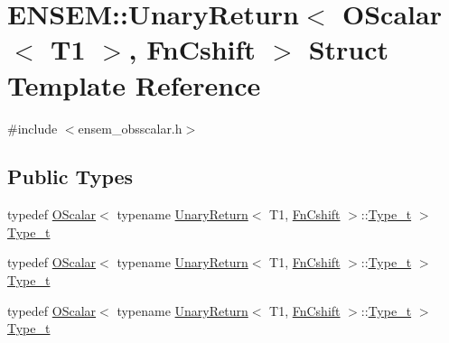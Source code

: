 \hypertarget{structENSEM_1_1UnaryReturn_3_01OScalar_3_01T1_01_4_00_01FnCshift_01_4}{}\section{E\+N\+S\+EM\+:\+:Unary\+Return$<$ O\+Scalar$<$ T1 $>$, Fn\+Cshift $>$ Struct Template Reference}
\label{structENSEM_1_1UnaryReturn_3_01OScalar_3_01T1_01_4_00_01FnCshift_01_4}


{\ttfamily \#include $<$ensem\+\_\+obsscalar.\+h$>$}

\subsection*{Public Types}
\begin{DoxyCompactItemize}
\item 
typedef \mbox{\hyperlink{classENSEM_1_1OScalar}{O\+Scalar}}$<$ typename \mbox{\hyperlink{structENSEM_1_1UnaryReturn}{Unary\+Return}}$<$ T1, \mbox{\hyperlink{structENSEM_1_1FnCshift}{Fn\+Cshift}} $>$\+::\mbox{\hyperlink{structENSEM_1_1UnaryReturn_3_01OScalar_3_01T1_01_4_00_01FnCshift_01_4_a98d26d4e3352558b80bc62389e24a27d}{Type\+\_\+t}} $>$ \mbox{\hyperlink{structENSEM_1_1UnaryReturn_3_01OScalar_3_01T1_01_4_00_01FnCshift_01_4_a98d26d4e3352558b80bc62389e24a27d}{Type\+\_\+t}}
\item 
typedef \mbox{\hyperlink{classENSEM_1_1OScalar}{O\+Scalar}}$<$ typename \mbox{\hyperlink{structENSEM_1_1UnaryReturn}{Unary\+Return}}$<$ T1, \mbox{\hyperlink{structENSEM_1_1FnCshift}{Fn\+Cshift}} $>$\+::\mbox{\hyperlink{structENSEM_1_1UnaryReturn_3_01OScalar_3_01T1_01_4_00_01FnCshift_01_4_a98d26d4e3352558b80bc62389e24a27d}{Type\+\_\+t}} $>$ \mbox{\hyperlink{structENSEM_1_1UnaryReturn_3_01OScalar_3_01T1_01_4_00_01FnCshift_01_4_a98d26d4e3352558b80bc62389e24a27d}{Type\+\_\+t}}
\item 
typedef \mbox{\hyperlink{classENSEM_1_1OScalar}{O\+Scalar}}$<$ typename \mbox{\hyperlink{structENSEM_1_1UnaryReturn}{Unary\+Return}}$<$ T1, \mbox{\hyperlink{structENSEM_1_1FnCshift}{Fn\+Cshift}} $>$\+::\mbox{\hyperlink{structENSEM_1_1UnaryReturn_3_01OScalar_3_01T1_01_4_00_01FnCshift_01_4_a98d26d4e3352558b80bc62389e24a27d}{Type\+\_\+t}} $>$ \mbox{\hyperlink{structENSEM_1_1UnaryReturn_3_01OScalar_3_01T1_01_4_00_01FnCshift_01_4_a98d26d4e3352558b80bc62389e24a27d}{Type\+\_\+t}}
\end{DoxyCompactItemize}


